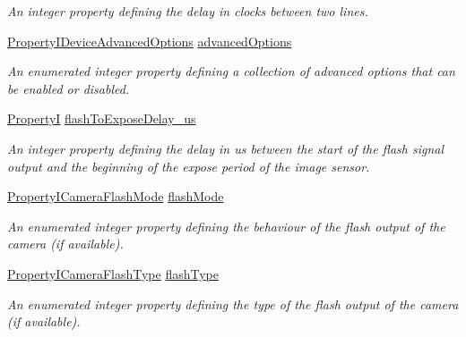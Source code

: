 \begin{DoxyCompactItemize}
\begin{DoxyCompactList}\small\item\em An integer property defining the delay in clocks between two lines. \end{DoxyCompactList}\item 
\hyperlink{group___device_specific_interface_ga100e69ae1a36b64b3abed0337f42628a}{Property\+I\+Device\+Advanced\+Options} \hyperlink{classmv_i_m_p_a_c_t_1_1acquire_1_1_camera_settings_blue_f_o_x_ab121de32a400194b4313fbadfa3abf01}{advanced\+Options}
\begin{DoxyCompactList}\small\item\em An enumerated integer property defining a collection of advanced options that can be enabled or disabled. \end{DoxyCompactList}\item 
\hyperlink{group___common_interface_ga12d5e434238ca242a1ba4c6c3ea45780}{Property\+I} \hyperlink{classmv_i_m_p_a_c_t_1_1acquire_1_1_camera_settings_blue_f_o_x_af918a5013ceba642fc62182417b23340}{flash\+To\+Expose\+Delay\+\_\+us}
\begin{DoxyCompactList}\small\item\em An integer property defining the delay in us between the start of the flash signal output and the beginning of the expose period of the image sensor. \end{DoxyCompactList}\item 
\hyperlink{group___device_specific_interface_ga6a8c7e0a6ec0abe20119f36cdde81a1c}{Property\+I\+Camera\+Flash\+Mode} \hyperlink{classmv_i_m_p_a_c_t_1_1acquire_1_1_camera_settings_blue_f_o_x_a5313c4dc12dd4b6bd30a2dbaef0f8436}{flash\+Mode}
\begin{DoxyCompactList}\small\item\em An enumerated integer property defining the behaviour of the flash output of the camera (if available). \end{DoxyCompactList}\item 
\hyperlink{group___device_specific_interface_ga597262f972ec6a59487c7434c39ecfba}{Property\+I\+Camera\+Flash\+Type} \hyperlink{classmv_i_m_p_a_c_t_1_1acquire_1_1_camera_settings_blue_f_o_x_a9a55515a629ceb7d7b0223711a370dd4}{flash\+Type}
\begin{DoxyCompactList}\small\item\em An enumerated integer property defining the type of the flash output of the camera (if available). \end{DoxyCompactList}\item 

\end{DoxyCompactItemize}
